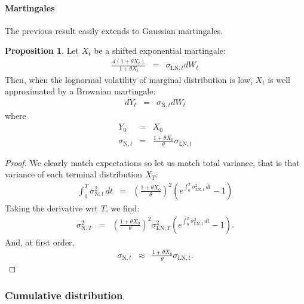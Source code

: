 \documentclass[11pt,english]{amsart}
\theoremstyle{definition}
\newtheorem{prop}{Proposition}
\begin{document}
\paragraph{Martingales}
The previous result easily extends to Gaussian martingales.

\begin{prop}
Let $X_t$ be a shifted exponential martingale:
\begin{eqnarray}
  \frac{d(1 + \theta X_t)}{1+\theta X_t}  
  &=& \sigma_{\mathrm{LN},t} dW_t  
\end{eqnarray}
Then, when the lognormal volatility of marginal distribution is low, $X_t$ is well approximated by a Brownian martingale:
\begin{eqnarray}
  dY_t   &=& \sigma_{\mathrm{N},t} dW_t  
\end{eqnarray}
where 
\begin{eqnarray}
   Y_0 &=& X_0 \\
   \sigma_{\mathrm{N},t} &=& \frac{1+\theta X_0}{\theta}  \sigma_{\mathrm{LN},t}
\end{eqnarray}
\end{prop}

\begin{proof}
We clearly match expectations so let us match total variance, that is that variance of each terminal distribution $X_T$:
\begin{eqnarray}
   \int_0^T \sigma_{\mathrm{N},t}^2 \, dt &=&  \left(\frac{1+\theta X_0}{\theta} \right)^2 \left( e^{\int_0^T \sigma_{\mathrm{LN},t}^2\, dt} - 1 \right)
\end{eqnarray}
Taking the derivative wrt $T$, we find:
\begin{eqnarray}
   \sigma_{\mathrm{N},T}^2  &=&  \left(\frac{1+\theta X_0}{\theta} \right)^2 \sigma_{\mathrm{LN},T}^2 \left(  e^{\int_0^T \sigma_{\mathrm{LN},t}^2\, dt} - 1 \right). 
\end{eqnarray}
And, at first order, 
\begin{eqnarray}
   \sigma_{\mathrm{N},t}  & \approx &  \frac{1+\theta X_0}{\theta}  \sigma_{\mathrm{LN},t}.
\end{eqnarray}
\end{proof}




\subsubsection{Cumulative distribution}
\end{document}
